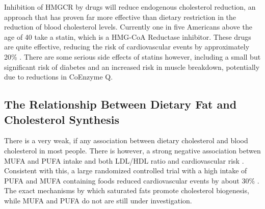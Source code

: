 \documentclass{tufte-handout}
\begin{document}
  Inhibition of HMGCR by drugs will reduce endogenous cholesterol reduction, an approach that has proven far more effective than dietary restriction in the reduction of blood cholesterol levels.  Currently one in five Americans above the age of 40 take a statin, which is a HMG-CoA Reductase inhibitor.  These drugs are quite effective, reducing the risk of cardiovascular events by approximately 20\% \citep{Treatment2010}.  There are some serious side effects of statins however, including a small but significant risk of diabetes and an increased risk in muscle breakdown, potentially due to reductions in CoEnzyme Q.

\subsection{The Relationship Between Dietary Fat and Cholesterol Synthesis}

There is a very weak, if any association between dietary cholesterol and blood cholesterol in most people.  There is however, a strong negative association betwen MUFA and PUFA intake and both LDL/HDL ratio and cardiovascular risk \citep{Hu1998,Zong2016}.  Consistent with this, a large randomized controlled trial with a high intake of PUFA and MUFA containing foods reduced cardiovascular events by about 30\% \citep{Estruch2013a}.  The exact mechanisms by which saturated fats promote cholesterol biogenesis, while MUFA and PUFA do not are still under investigation.



\end{document}
